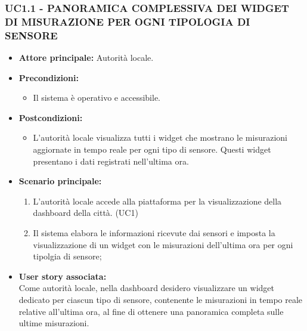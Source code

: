\subsubsection{UC1.1 - PANORAMICA COMPLESSIVA DEI WIDGET DI MISURAZIONE PER OGNI TIPOLOGIA DI SENSORE}
\begin{itemize}
    \item \textbf{Attore principale:} Autorità locale.
    \item \textbf{Precondizioni:}
        \begin{itemize}
            \item Il sistema è operativo e accessibile.
        \end{itemize}
    \item \textbf{Postcondizioni:}
        \begin{itemize}
            \item L'autorità locale visualizza tutti i widget che mostrano le misurazioni aggiornate in tempo reale per ogni tipo di sensore. Questi widget presentano i dati registrati nell'ultima ora.
        \end{itemize}
    \item \textbf{Scenario principale:}
        \begin{enumerate}
            \item L'autorità locale accede alla piattaforma per la visualizzazione della dashboard della città. (UC1)
            \item Il sistema elabora le informazioni ricevute dai sensori e imposta la visualizzazione di un widget con le misurazioni dell'ultima ora per ogni tipolgia di sensore;
        \end{enumerate}
    \item \textbf{User story associata:} \\
        Come autorità locale, nella dashboard desidero visualizzare un widget dedicato per ciascun tipo di sensore, contenente le misurazioni in tempo reale relative all'ultima ora, al fine di ottenere una panoramica completa sulle ultime misurazioni.
\end{itemize}
